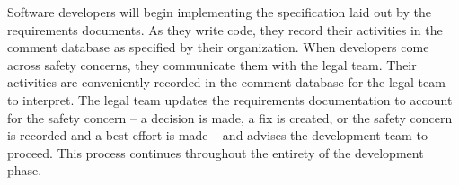 Software developers will begin implementing the specification laid out by the
requirements documents. As they write code, they record their activities in the
comment database as specified by their organization. When developers come across
safety concerns, they communicate them with the legal team. Their activities are
conveniently recorded in the comment database for the legal team to interpret.
The legal team updates the requirements documentation to account for the safety
concern -- a decision is made, a fix is created, or the safety concern is
recorded and a best-effort is made -- and advises the development team to
proceed. This process continues throughout the entirety of the development
phase. 
